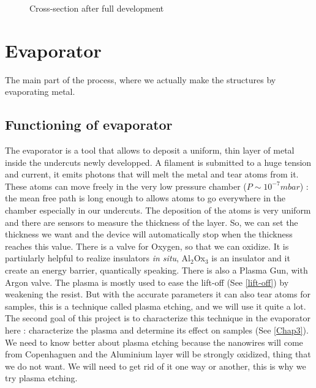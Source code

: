             \begin{figure}[H]
            \centering
            \caption{Cross-section after full development}
            \label{Aprèsdvpt}
            \end{figure}
            
    \section{Evaporator}
        The main part of the process, where we actually make the structures by evaporating metal.
        \subsection{Functioning of evaporator}
        
        The evaporator is a tool that allows to deposit a uniform, thin layer of metal inside the undercuts newly developped. A filament is submitted to a huge tension and current, it emits photons that will melt the metal and tear atoms from it. These atoms can move freely in the very low pressure chamber ($P\sim10^{-7}mbar$) : the mean free path is long enough to allows atoms to go everywhere in the chamber especially in our undercuts. The deposition of the atoms is very uniform and there are sensors to measure the thickness of the layer. So, we can set the thickness we want and the device will automatically stop when the thickness reaches this value.
        There is a valve for Oxygen, so that we can oxidize. It is partiularly helpful to realize insulators \textit{in situ}, Al$_2$Ox$_3$ is an insulator and it create an energy barrier, quantically speaking.
        There is also a Plasma Gun, with Argon valve. The plasma is mostly used to ease the lift-off (See \ref{lift-off}) by weakening the resist. But with the accurate parameters it can also tear atoms for samples, this is a technique called plasma etching, and we will use it quite a lot. The second goal of this project is to characterize this technique in the evaporator here : characterize the plasma and determine its effect on samples (See \ref{Chap3}). We need to know better about plasma etching because the nanowires will come from Copenhaguen and the Aluminium layer will be strongly oxidized, thing that we do not want. We will need to get rid of it one way or another, this is why we try plasma etching.           
            
